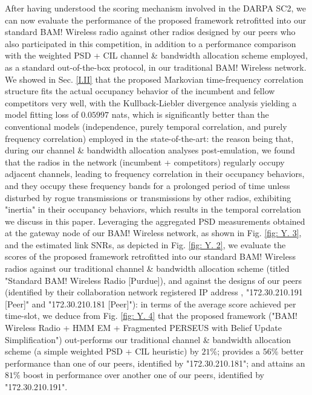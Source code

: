 \documentclass[12pt, draftcls, onecolumn]{IEEEtran}
\begin{document}
After having understood the scoring mechanism involved in the DARPA SC2, we can now evaluate the performance of the proposed framework retrofitted into our standard BAM! Wireless radio \cite{BAM} against other radios designed by our peers who also participated in this competition, in addition to a performance comparison with the weighted PSD + CIL \cite{DARPA:CIL} channel \& bandwidth allocation scheme employed, as a standard out-of-the-box protocol, in our traditional BAM! Wireless network. We showed in Sec. \ref{I.II} that the proposed Markovian time-frequency correlation structure fits the actual occupancy behavior of the incumbent and fellow competitors very well, with the Kullback-Liebler divergence analysis yielding a model fitting loss of $0.05997$ nats, which is significantly better than the conventional models (independence, purely temporal correlation, and purely frequency correlation) employed in the state-of-the-art: the reason being that, during our channel \& bandwidth allocation analyses post-emulation, we found that the radios in the network (incumbent + competitors) regularly occupy adjacent channels, leading to frequency correlation in their occupancy behaviors, and they occupy these frequency bands for a prolonged period of time unless disturbed by rogue transmissions or transmissions by other radios, exhibiting "inertia" in their occupancy behaviors, which results in the temporal correlation we discuss in this paper. Leveraging the aggregated PSD measurements obtained at the gateway node of our BAM! Wireless network, as shown in Fig. \ref{fig: Y. 3}, and the estimated link SNRs, as depicted in Fig. \ref{fig: Y. 2}, we evaluate the scores of the proposed framework retrofitted into our standard BAM! Wireless radios against our traditional channel \& bandwidth allocation scheme (titled "Standard BAM! Wireless Radio [Purdue]), and against the designs of our peers (identified by their collaboration network registered IP address \cite{DARPA:CIL}, "172.30.210.191 [Peer]" and "172.30.210.181 [Peer]"): in terms of the average score achieved per time-slot, we deduce from Fig. \ref{fig: Y. 4} that the proposed framework ("BAM! Wireless Radio + HMM EM + Fragmented PERSEUS with Belief Update Simplification") out-performs our traditional channel \& bandwidth allocation scheme (a simple weighted PSD + CIL heuristic) by $21$\%; provides a $56$\% better performance than one of our peers, identified by "172.30.210.181"; and attains an $81$\% boost in performance over another one of our peers, identified by "172.30.210.191".
\end{document}
